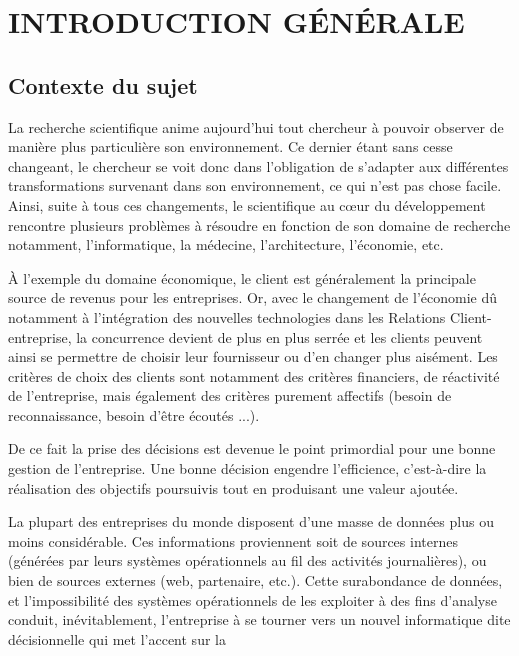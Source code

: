 \chapter*{INTRODUCTION GÉNÉRALE}
    \section[Contexte du sujet]{Contexte du sujet}
    La recherche scientifique anime aujourd’hui tout chercheur
    à pouvoir observer de manière
    plus particulière son environnement. Ce dernier étant
    sans cesse changeant, le chercheur se voit donc
    dans l’obligation de s’adapter aux différentes transformations
    survenant dans son environnement, ce qui n’est pas chose facile.
    Ainsi, suite à tous ces changements, le scientifique au cœur du
    développement rencontre plusieurs problèmes à résoudre en
    fonction de son domaine de recherche notamment, l’informatique,
    la médecine, l’architecture, l’économie, etc.
    \par
    À l’exemple du domaine
    économique, 
    le client est généralement la principale source de 
    revenus pour les entreprises. 
    Or, avec le changement de l’économie dû notamment
    à l’intégration des nouvelles technologies
    dans les Relations Client-entreprise, la concurrence
    devient de plus en plus serrée et les
    clients peuvent ainsi se permettre de choisir
    leur fournisseur ou d’en changer plus aisément.
    Les critères de choix des clients sont notamment des
    critères financiers, de réactivité de l’entreprise, mais
    également des critères purement affectifs
    (besoin de reconnaissance, besoin d’être écoutés ...).
    \par
    De ce fait la prise des décisions est devenue
    le point primordial pour une bonne gestion de
    l’entreprise. Une bonne décision engendre l’efficience,
    c’est-à-dire la réalisation des objectifs
    poursuivis tout en produisant une valeur ajoutée.
    \par
    La plupart des entreprises du monde disposent d’une masse de données plus ou
    moins considérable. Ces informations proviennent soit de sources internes (générées par
    leurs systèmes opérationnels au fil des activités journalières), ou bien de sources externes
    (web, partenaire, etc.). Cette surabondance de données, et l’impossibilité des systèmes
    opérationnels de les exploiter à des fins d’analyse conduit, inévitablement, l’entreprise à se
    tourner vers un nouvel informatique dite décisionnelle qui met l’accent sur la
